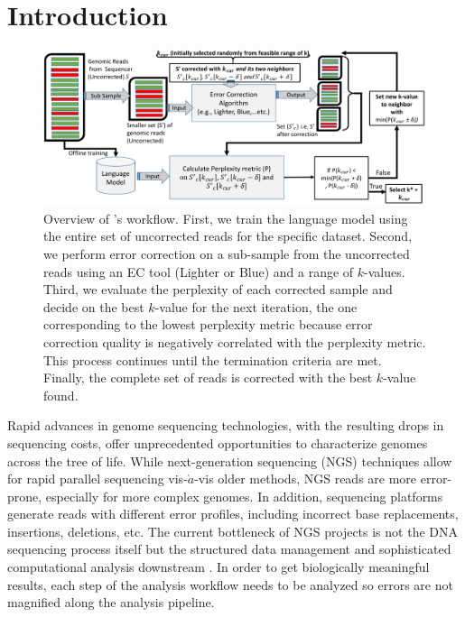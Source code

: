 \section{Introduction}
\begin{figure}
\centering
\includegraphics[width=\linewidth]{figs/AthenaOverview_Compressed2_cropped.pdf}
\caption{Overview of \name's workflow. First, we train the language model using the entire set of uncorrected reads for the specific dataset. Second, we perform error correction on a sub-sample from the uncorrected reads using an EC tool (\eg Lighter or Blue) and a range of $k$-values. Third, we evaluate the perplexity of each corrected sample and decide on the best $k$-value for the next iteration, \ie the one corresponding to the lowest perplexity metric because error correction quality is negatively correlated with the perplexity metric. This process continues until the termination criteria are met. Finally, the complete set of reads is corrected with the best $k$-value found.}	
\label{fig:AthenaOverview}
\end{figure}
\vspace{-10pt}
Rapid advances in genome sequencing technologies, with the resulting drops in sequencing costs, offer unprecedented opportunities to characterize genomes across the tree of life. %
While next-generation sequencing (NGS) techniques allow for rapid parallel sequencing vis-$\grave{a}$-vis older methods, NGS reads are more error-prone, especially for more complex genomes. %
In addition, sequencing platforms generate reads with different error profiles, including incorrect base replacements, insertions, deletions, etc. The current bottleneck of NGS projects is not the DNA sequencing process itself but the structured data management and sophisticated computational analysis downstream \cite{schadt2010computational}. In order to get biologically meaningful results, each step of the analysis workflow needs to be analyzed so errors are not magnified along the analysis pipeline.
